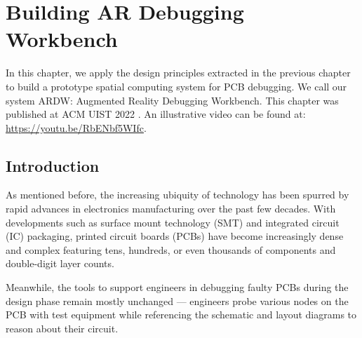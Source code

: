\documentclass [11pt, proquest] {uwthesis}[2020/02/24]
\newcommand{\ARDWname}{ARDW}
\begin{document}





\chapter{Building AR Debugging Workbench}

In this chapter, we apply the design principles extracted in the previous chapter to build a prototype spatial computing system for PCB debugging. We call our system \ARDWname: Augmented Reality Debugging Workbench. This chapter was published at ACM UIST 2022 \cite{10.1145/3526113.3545684}. An illustrative video can be found at: \url{https://youtu.be/RbENbf5WIfc}.

\section{Introduction}
\label{sec:intro}


As mentioned before, the increasing ubiquity of technology has been spurred by rapid advances in electronics manufacturing over the past few decades.
With developments such as surface mount technology (SMT) and integrated circuit (IC) packaging, printed circuit boards (PCBs) have become increasingly dense and complex featuring tens, hundreds, or even thousands of components and double-digit layer counts.

Meanwhile, the tools to support engineers in debugging faulty PCBs during the design phase remain mostly unchanged
--- engineers probe various nodes on the PCB with test equipment while referencing the schematic and layout diagrams
to reason about their circuit. 
\end{document}

